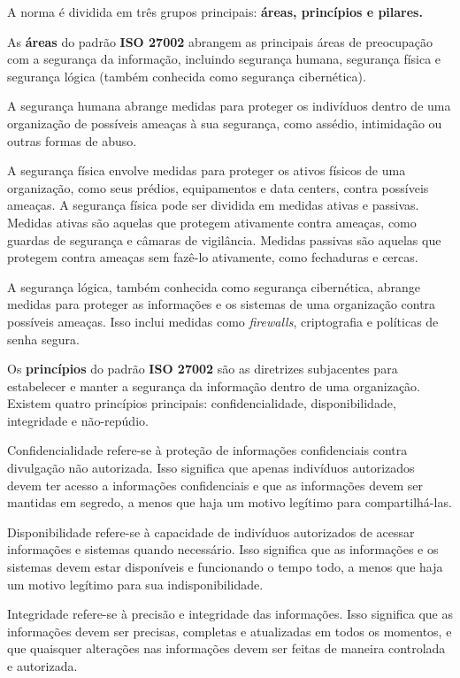 A norma é dividida em três grupos principais: \textbf{áreas, princípios e pilares.}

As \textbf{áreas} do padrão \textbf{ISO 27002} abrangem as principais áreas de preocupação com a segurança da informação, incluindo segurança humana, segurança física e segurança lógica (também conhecida como segurança cibernética).

A segurança humana abrange medidas para proteger os indivíduos dentro de uma organização de possíveis ameaças à sua segurança, como assédio, intimidação ou outras formas de abuso.

A segurança física envolve medidas para proteger os ativos físicos de uma organização, como seus prédios, equipamentos e data centers, contra possíveis ameaças. A segurança física pode ser dividida em medidas ativas e passivas. Medidas ativas são aquelas que protegem ativamente contra ameaças, como guardas de segurança e câmaras de vigilância. Medidas passivas são aquelas que protegem contra ameaças sem fazê-lo ativamente, como fechaduras e cercas.

A segurança lógica, também conhecida como segurança cibernética, abrange medidas para proteger as informações e os sistemas de uma organização contra possíveis ameaças. Isso inclui medidas como \textit{firewalls}, criptografia e políticas de senha segura.

Os \textbf{princípios} do padrão \textbf{ISO 27002} são as diretrizes subjacentes para estabelecer e manter a segurança da informação dentro de uma organização. Existem quatro princípios principais: confidencialidade, disponibilidade, integridade e não-repúdio.

Confidencialidade refere-se à proteção de informações confidenciais contra divulgação não autorizada. Isso significa que apenas indivíduos autorizados devem ter acesso a informações confidenciais e que as informações devem ser mantidas em segredo, a menos que haja um motivo legítimo para compartilhá-las.

Disponibilidade refere-se à capacidade de indivíduos autorizados de acessar informações e sistemas quando necessário. Isso significa que as informações e os sistemas devem estar disponíveis e funcionando o tempo todo, a menos que haja um motivo legítimo para sua indisponibilidade.

Integridade refere-se à precisão e integridade das informações. Isso significa que as informações devem ser precisas, completas e atualizadas em todos os momentos, e que quaisquer alterações nas informações devem ser feitas de maneira controlada e autorizada.

